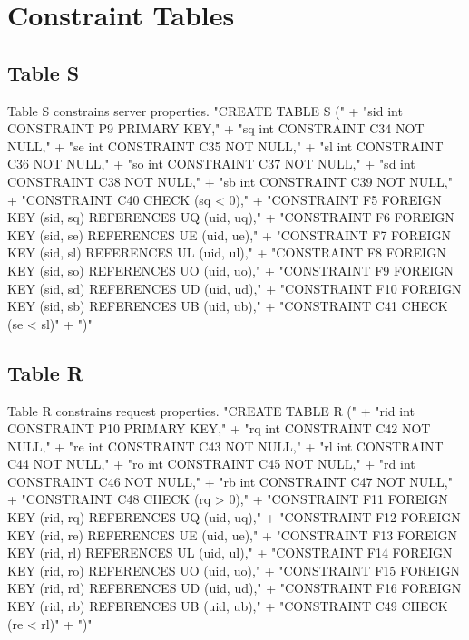 \section{Constraint Tables}

\subsection{Table S}
Table S constrains server properties.
\nwenddocs{}\endmoddef{}
"CREATE TABLE S ("
  + "sid int  CONSTRAINT P9 PRIMARY KEY,"
  + "sq  int  CONSTRAINT C34 NOT NULL,"
  + "se  int  CONSTRAINT C35 NOT NULL,"
  + "sl  int  CONSTRAINT C36 NOT NULL,"
  + "so  int  CONSTRAINT C37 NOT NULL,"
  + "sd  int  CONSTRAINT C38 NOT NULL,"
  + "sb  int  CONSTRAINT C39 NOT NULL,"
  + "CONSTRAINT C40 CHECK (sq < 0),"
  + "CONSTRAINT F5 FOREIGN KEY (sid, sq) REFERENCES UQ (uid, uq),"
  + "CONSTRAINT F6 FOREIGN KEY (sid, se) REFERENCES UE (uid, ue),"
  + "CONSTRAINT F7 FOREIGN KEY (sid, sl) REFERENCES UL (uid, ul),"
  + "CONSTRAINT F8 FOREIGN KEY (sid, so) REFERENCES UO (uid, uo),"
  + "CONSTRAINT F9 FOREIGN KEY (sid, sd) REFERENCES UD (uid, ud),"
  + "CONSTRAINT F10 FOREIGN KEY (sid, sb) REFERENCES UB (uid, ub),"
  + "CONSTRAINT C41 CHECK (se < sl)"
  + ")"
\nwendcode{}\nwdocspar

\subsection{Table R}
Table R constrains request properties.
\nwenddocs{}\endmoddef{}
"CREATE TABLE R ("
  + "rid int  CONSTRAINT P10 PRIMARY KEY,"
  + "rq  int  CONSTRAINT C42 NOT NULL,"
  + "re  int  CONSTRAINT C43 NOT NULL,"
  + "rl  int  CONSTRAINT C44 NOT NULL,"
  + "ro  int  CONSTRAINT C45 NOT NULL,"
  + "rd  int  CONSTRAINT C46 NOT NULL,"
  + "rb  int  CONSTRAINT C47 NOT NULL,"
  + "CONSTRAINT C48 CHECK (rq > 0),"
  + "CONSTRAINT F11 FOREIGN KEY (rid, rq) REFERENCES UQ (uid, uq),"
  + "CONSTRAINT F12 FOREIGN KEY (rid, re) REFERENCES UE (uid, ue),"
  + "CONSTRAINT F13 FOREIGN KEY (rid, rl) REFERENCES UL (uid, ul),"
  + "CONSTRAINT F14 FOREIGN KEY (rid, ro) REFERENCES UO (uid, uo),"
  + "CONSTRAINT F15 FOREIGN KEY (rid, rd) REFERENCES UD (uid, ud),"
  + "CONSTRAINT F16 FOREIGN KEY (rid, rb) REFERENCES UB (uid, ub),"
  + "CONSTRAINT C49 CHECK (re < rl)"
  + ")"
\nwendcode{}\nwdocspar

